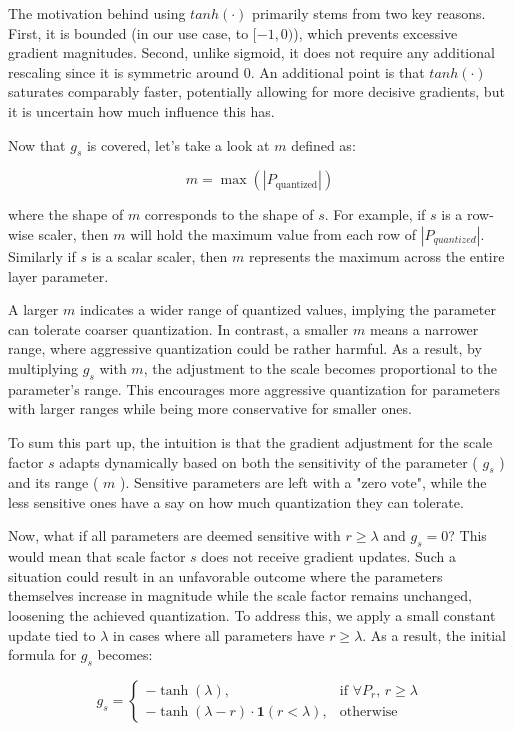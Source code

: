 The motivation behind using \( tanh(\cdot) \) primarily stems from two key reasons. 
First, it is bounded (in our use case, to \( [-1, 0) \)), which prevents excessive gradient magnitudes.
Second, unlike sigmoid, it does not require any additional rescaling since it is
symmetric around \( 0 \). An additional point is that \( tanh(\cdot) \) saturates comparably faster,
potentially allowing for more decisive gradients,
but it is uncertain how much influence this has.

Now that \( g_s \) is covered, let's take a look at \( m \) defined as:

\[
m = \max\left(\left| P_{\text{quantized}} \right|\right) 
\]

where the shape of \( m \) corresponds to the shape of \( s \).
For example, if \( s \) is a row-wise scaler, then \( m  \) will hold
the maximum value from each row of \( \left| P_{quantized} \right|\).
Similarly if  \( s \) is a scalar scaler, then \( m \) represents
the maximum across the entire layer parameter.

A larger \( m \) indicates a wider range of quantized values,
implying the parameter can tolerate coarser quantization.
In contrast, a smaller \( m \) means a narrower range,
where aggressive quantization could be rather harmful.
As a result, by multiplying \( g_s\) with \( m \), 
the adjustment to the scale becomes proportional to the parameter's range.
This encourages more aggressive quantization for parameters with larger ranges
while being more conservative for smaller ones.

To sum this part up, the intuition is that the gradient adjustment for the scale factor
\( s \) adapts dynamically based on both the sensitivity of the parameter ( \( g_s\) )
and its range ( \( m \) ). Sensitive parameters are left with a "zero vote",
while the less sensitive ones have a say on how much quantization they can tolerate.

Now, what if all parameters are deemed sensitive with \( r \geq \lambda\) and
\( g_s =  0 \)? This would mean that scale factor \(s\) does not receive gradient updates.
Such a situation could result in an unfavorable outcome
where the parameters themselves increase in magnitude while the scale factor remains unchanged,
loosening the achieved quantization.
To address this, we apply a small constant update tied to \( \lambda \) in cases where 
all parameters have \( r \geq \lambda\). As a result, the initial formula for \( g_s\) becomes:

\[
g_s = 
\begin{cases} 
- \tanh(\lambda), & \text{if } \forall P_r, \, r \geq \lambda \\
- \tanh(\lambda - r) \cdot \mathbf{1}(r < \lambda), & \text{otherwise}
\end{cases}
\]

